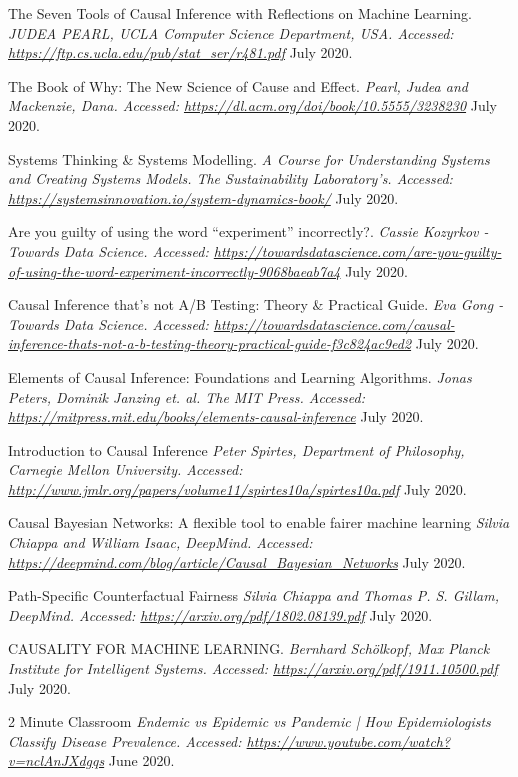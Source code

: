 \begin{thebibliography}{1}
 The Seven Tools of Causal Inference with Reflections on Machine Learning. {\em JUDEA PEARL, UCLA Computer Science Department, USA. Accessed:  \url{https://ftp.cs.ucla.edu/pub/stat_ser/r481.pdf}} July 2020.

 The Book of Why: The New Science of Cause and Effect. {\em Pearl, Judea and Mackenzie, Dana. Accessed:  \url{https://dl.acm.org/doi/book/10.5555/3238230}} July 2020.

 Systems Thinking & Systems Modelling. {\em A Course for Understanding Systems and Creating Systems Models. The Sustainability Laboratory’s. Accessed:  \url{https://systemsinnovation.io/system-dynamics-book/}} July 2020.

 Are you guilty of using the word “experiment” incorrectly?. {\em Cassie Kozyrkov - Towards Data Science. Accessed:  \url{https://towardsdatascience.com/are-you-guilty-of-using-the-word-experiment-incorrectly-9068baeab7a4}} July 2020.

 Causal Inference that’s not A/B Testing: Theory & Practical Guide. {\em Eva Gong - Towards Data Science. Accessed:  \url{https://towardsdatascience.com/causal-inference-thats-not-a-b-testing-theory-practical-guide-f3c824ac9ed2}} July 2020.

 Elements of Causal Inference: Foundations and Learning Algorithms. {\em  Jonas Peters, Dominik Janzing et. al. The MIT Press. Accessed:  \url{https://mitpress.mit.edu/books/elements-causal-inference}} July 2020.

Introduction to Causal Inference
{\em Peter Spirtes, Department of Philosophy, Carnegie Mellon University. Accessed:  \url{http://www.jmlr.org/papers/volume11/spirtes10a/spirtes10a.pdf}} July 2020.

Causal Bayesian Networks: A flexible tool to enable fairer machine learning
{\em Silvia Chiappa and William Isaac, DeepMind. Accessed:  \url{https://deepmind.com/blog/article/Causal_Bayesian_Networks}} July 2020.

Path-Specific Counterfactual Fairness
{\em Silvia Chiappa and Thomas P. S. Gillam, DeepMind. Accessed:  \url{https://arxiv.org/pdf/1802.08139.pdf}} July 2020.

 CAUSALITY FOR MACHINE LEARNING. {\em Bernhard Schölkopf, Max Planck Institute for Intelligent Systems. Accessed:  \url{https://arxiv.org/pdf/1911.10500.pdf}} July 2020.

 2 Minute Classroom {\em Endemic vs Epidemic vs Pandemic | How Epidemiologists Classify Disease Prevalence. Accessed:  \url{https://www.youtube.com/watch?v=nclAnJXdgqs}} June 2020.


\end{thebibliography}

